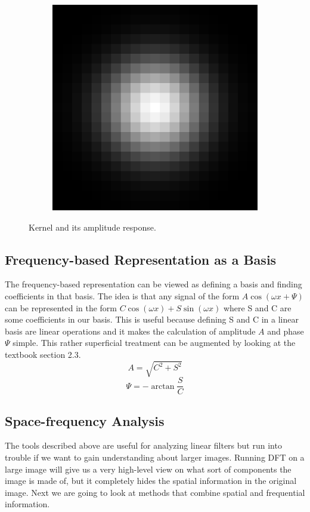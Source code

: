 \documentclass[]{article}
\begin{document}
\begin{figure}
\begin{subfigure}[t]{0.49\textwidth}
      \includegraphics[width=0.99\linewidth]{freq2.png}
    \end{subfigure}
    \caption{Kernel and its amplitude response.}
\end{figure}

\subsection{Frequency-based Representation as a Basis}
\label{frequency-based-representation-as-a-basis}
The frequency-based representation can be viewed as defining a basis and
finding coefficients in that basis. The idea is that any signal of the form $A
\cos(\omega x + \Psi)$ can be represented in the form $C\cos(\omega x) +
S\sin(\omega x)$ where S and C are some coefficients in our basis. This is
useful because defining S and C in a linear basis are linear operations and it
makes the calculation of amplitude $A$ and phase $\Psi$ simple. This rather
superficial treatment can be augmented by looking at the textbook section 2.3.
\begin{equation}
  A = \sqrt{C^{2}+S^{2}}
\end{equation}
\begin{equation}
  \Psi = -\arctan{\frac{S}{C}}
\end{equation}

\subsection{Space-frequency Analysis}
\label{space-frequency-analysis}
The tools described above are useful for analyzing linear filters but run into
trouble if we want to gain understanding about larger images. Running DFT on a
large image will give us a very high-level view on what sort of components the
image is made of, but it completely hides the spatial information in the
original image. Next we are going to look at methods that combine spatial and
frequential information.
\end{document}
